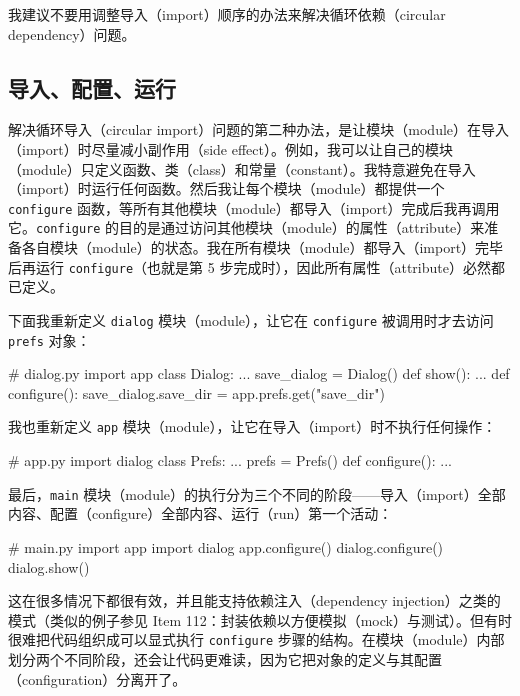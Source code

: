 我建议不要用调整导入（import）顺序的办法来解决循环依赖（circular dependency）问题。

\subsection{导入、配置、运行}

解决循环导入（circular import）问题的第二种办法，是让模块（module）在导入（import）时尽量减小副作用（side effect）。例如，我可以让自己的模块（module）只定义函数、类（class）和常量（constant）。我特意避免在导入（import）时运行任何函数。然后我让每个模块（module）都提供一个 \texttt{configure} 函数，等所有其他模块（module）都导入（import）完成后我再调用它。\texttt{configure} 的目的是通过访问其他模块（module）的属性（attribute）来准备各自模块（module）的状态。我在所有模块（module）都导入（import）完毕后再运行 \texttt{configure}（也就是第 5 步完成时），因此所有属性（attribute）必然都已定义。

下面我重新定义 \texttt{dialog} 模块（module），让它在 \texttt{configure} 被调用时才去访问 \texttt{prefs} 对象：

\begin{codebox}[python]
# dialog.py
import app
class Dialog:
    ...
save_dialog = Dialog()
def show():
    ...
def configure():
    save_dialog.save_dir = app.prefs.get("save_dir")
\end{codebox}

我也重新定义 \texttt{app} 模块（module），让它在导入（import）时不执行任何操作：

\begin{codebox}[python]
# app.py
import dialog
class Prefs:
    ...
prefs = Prefs()
def configure():
    ...
\end{codebox}

最后，\texttt{main} 模块（module）的执行分为三个不同的阶段——导入（import）全部内容、配置（configure）全部内容、运行（run）第一个活动：

\begin{codebox}[python]
# main.py
import app
import dialog
app.configure()
dialog.configure()
dialog.show()
\end{codebox}

这在很多情况下都很有效，并且能支持依赖注入（dependency injection）之类的模式（类似的例子参见 Item 112：封装依赖以方便模拟（mock）与测试）。但有时很难把代码组织成可以显式执行 \texttt{configure} 步骤的结构。在模块（module）内部划分两个不同阶段，还会让代码更难读，因为它把对象的定义与其配置（configuration）分离开了。

